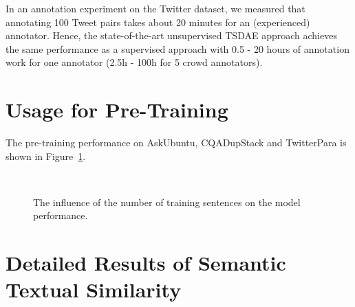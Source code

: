 \documentclass[11pt]{article}
\begin{document}
In an annotation experiment on the Twitter dataset, we measured that annotating 100 Tweet pairs takes about 20 minutes for an (experienced) annotator. Hence, the state-of-the-art unsupervised TSDAE approach achieves the same performance as a supervised approach with  0.5 - 20 hours of annotation work for one annotator (2.5h - 100h for 5 crowd annotators).  

\begin{table}[H]
\centering
{}
\caption{Intersection point (number of labeled sentence pairs) between unsupervised TSDAE and in-domain supervised SBERT.}
\label{tbl:equivalent_labeling_work}
\end{table}

\section{Usage for Pre-Training}
\label{sec:pre_training_detailed}
The pre-training performance on AskUbuntu, CQADupStack and TwitterPara is shown in Figure~\ref{fig:pretraining_effect_lg}.

\begin{figure}[H]
  \centering
  \quad\quad
   \\
  \quad\quad
  \caption{The influence of the number of training sentences on the model performance.}
  \label{fig:pretraining_effect_lg}
\end{figure}

\section{Detailed Results of Semantic Textual Similarity}
\label{sec:detailed_sts}
\end{document}
